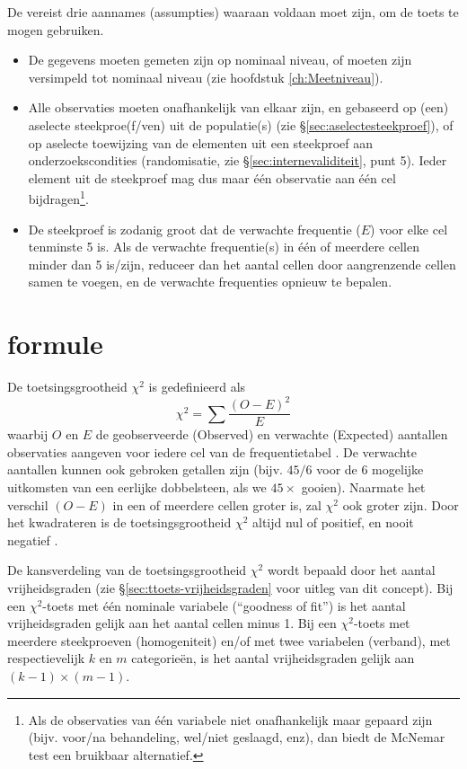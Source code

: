 \documentclass[
]{book}
\begin{document}
De vereist drie aannames (assumpties) waaraan voldaan moet zijn, om de
toets te mogen gebruiken.

\begin{itemize}
\item
  De gegevens moeten gemeten zijn op nominaal niveau, of moeten
  zijn versimpeld tot nominaal niveau (zie hoofdstuk \ref{ch:Meetniveau}).
\item
  Alle observaties moeten onafhankelijk van elkaar zijn, en
  gebaseerd op (een) aselecte steekproe(f/ven) uit de populatie(s) (zie
  §\ref{sec:aselectesteekproef}), of op aselecte toewijzing van de
  elementen uit een steekproef aan onderzoekscondities (randomisatie, zie §\ref{sec:internevaliditeit}, punt 5). Ieder element uit de steekproef mag dus maar één observatie aan één
  cel bijdragen\footnote{Als de observaties van één variabele niet onafhankelijk maar gepaard zijn (bijv. voor/na behandeling, wel/niet geslaagd, enz), dan biedt de McNemar test een bruikbaar alternatief.}.
\item
  De steekproef is zodanig groot dat de verwachte frequentie
  (\(E\)) voor elke cel tenminste 5 is. Als de verwachte frequentie(s) in
  één of meerdere cellen minder dan 5 is/zijn, reduceer dan het aantal
  cellen door aangrenzende cellen samen te voegen, en de verwachte
  frequenties opnieuw te bepalen.
\end{itemize}

\hypertarget{formule}{%
\section{formule}\label{formule}}

De toetsingsgrootheid \(\chi^2\) is gedefinieerd als
\begin{equation}
  \label{eq:chikwadraat}
    \chi^2 = \sum \frac{(O-E)^2}{E}
\end{equation}
waarbij \(O\) en \(E\) de
geobserveerde (Observed) en verwachte (Expected) aantallen observaties
aangeven voor iedere cel van de frequentietabel \citep{Ferg89}. De verwachte
aantallen kunnen ook gebroken getallen zijn (bijv. \(45/6\) voor de 6
mogelijke uitkomsten van een eerlijke dobbelsteen, als we \(45\times\)
gooien). Naarmate het verschil \((O-E)\) in een of meerdere cellen groter
is, zal \(\chi^2\) ook groter zijn. Door het kwadrateren is de
toetsingsgrootheid \(\chi^2\) altijd nul of positief, en nooit negatief
\citep{Ferg89}.

De kansverdeling van de toetsingsgrootheid \(\chi^2\) wordt bepaald door
het aantal vrijheidsgraden (zie
§\ref{sec:ttoets-vrijheidsgraden} voor uitleg van dit concept).
Bij een \(\chi^2\)-toets met één nominale variabele (``goodness of fit'') is het aantal
vrijheidsgraden gelijk aan het aantal cellen minus 1. Bij een \(\chi^2\)-toets met
meerdere steekproeven (homogeniteit) en/of met twee variabelen
(verband), met respectievelijk \(k\) en \(m\) categorieën, is het aantal
vrijheidsgraden gelijk aan \((k-1)\times(m-1)\).
\end{document}
